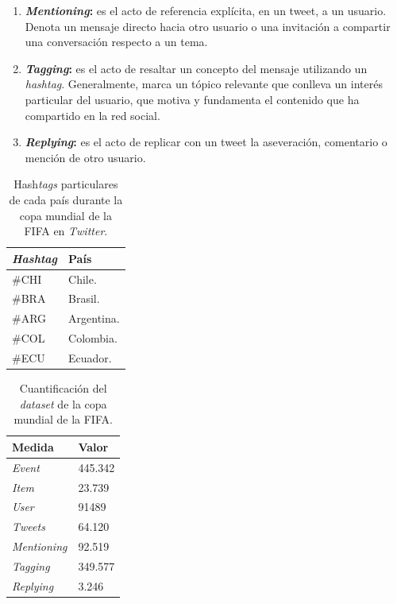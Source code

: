 \begin{enumerate}[I]
  \item \textbf{\textit{Mentioning}:} es el acto de referencia explícita, en un tweet, a un usuario. Denota un mensaje directo hacia otro usuario o una invitación a compartir una conversación respecto a un tema.
  \item \textbf{\textit{Tagging}:} es el acto de resaltar un concepto del mensaje utilizando un \textit{hashtag}. Generalmente, marca un tópico relevante que conlleva un interés particular del usuario, que motiva y fundamenta el contenido que ha compartido en la red social.
  \item \textbf{\textit{Replying}:} es el acto de replicar con un tweet la aseveración, comentario o mención de otro usuario.
\end{enumerate}

\begin{table}[H]
  \begin{center}
    \caption{Hash\textit{tags} particulares de cada país durante la copa mundial de la FIFA en \textit{Twitter}.}
    \label{tab:exp-tab01}
      \begin{tabular}{|L{4cm}|L{4cm}|}
        \hline
        \textbf{\textit{Hashtag}} & \textbf{País}\\ \hline
         \#CHI & Chile.\\ \hline
         \#BRA & Brasil.\\ \hline
         \#ARG & Argentina.\\ \hline
         \#COL & Colombia. \\ \hline
         \#ECU & Ecuador. \\ \hline
      \end{tabular}
  \end{center}
\end{table}

\begin{table}[H]
  \begin{center}
    \caption{Cuantificación del \textit{data\textit{set}} de la copa mundial de la FIFA.}
    \label{tab:exp-tab02}
      \begin{tabular}{|L{4cm}|L{4cm}|}
        \hline
        \textbf{Medida} & \textbf{Valor}\\ \hline
         \textit{Event} & 445.342\\ \hline
         \textit{Item} & 23.739\\ \hline
         \textit{User} & 91489\\ \hline
         \textit{Tweets} & 64.120\\ \hline
         \textit{Mentioning} & 92.519\\ \hline
         \textit{Tagging} & 349.577\\ \hline
         \textit{Replying} & 3.246\\ \hline
      \end{tabular}
  \end{center}
\end{table}

